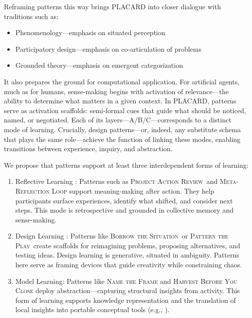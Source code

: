 \documentclass[acmlarge,timestamp]{acmart}
\providecommand{\tightlist}{%
  \setlength{\itemsep}{0pt}\setlength{\parskip}{0pt}}
\begin{document}
Reframing patterns this way brings PLACARD into closer dialogue with
traditions such as:

\begin{itemize}
\tightlist
\item
  Phenomenology—emphasis on situated perception \cite{phenomenology-intro}
\item
  Participatory design—emphasis on co-articulation of problems \cite{participatory-design}
\item
 Grounded theory—emphasis on emergent categorization \cite{glasser}
\end{itemize}

It also prepares the ground for computational application. For
artificial agents, much as for humans, sense-making begins with
activation of relevance---the ability to determine what matters in a
given context. In PLACARD, patterns serve as activation scaffolds:
semi-formal cues that guide what should be noticed, named, or
negotiated.  Each of its layers---A/B/C---corresponds to a distinct
mode of learning.  Crucially, design patterns---or, indeed, any
substitute schema that plays the same role---achieve the function of
linking these modes, enabling transitions between experience, inquiry,
and abstraction.

We propose that patterns support at least three interdependent forms
of learning:

\begin{enumerate}
\tightlist
\item
  Reflective Learning \cite{Boyd1983}: Patterns such as
  {\scshape{Project Action Review}}{~and }{\scshape{Meta-Reflection
      Loop}} support meaning-making after action. They help
  participants surface experiences, identify what shifted, and
  consider next steps. This mode is retrospective and grounded in
  collective memory and sense-making.
\item
 Design Learning \cite{BurdickDesign}: Patterns like {\scshape{Borrow the
     Situation}}~or {\scshape{Pattern the Play}}~create
 scaffolds for reimagining problems, proposing alternatives, and
 testing ideas.  Design learning is generative, situated in
 ambiguity. Patterns here serve as framing devices that guide
 creativity while constraining chaos.
\item Model Learning: Patterns like {\scshape{Name the Frame}} and
  {\scshape{Harvest Before You Close}} deploy abstraction---capturing
  structural insights from activity. This form of learning supports
  knowledge representation and the translation of local insights into
  portable conceptual tools (e.g., \cite{ariyaratne1977a}).
\end{enumerate}
\end{document}
